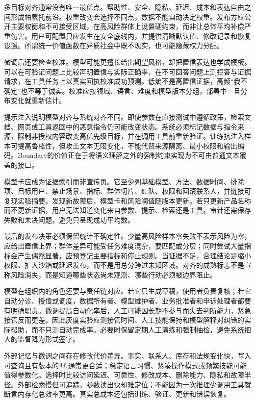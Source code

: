 多目标对齐通常没有唯一最优点。帮助性、安全、隐私、延迟、成本和表达自由之间形成帕累托前沿。权重改变会选择不同点，数据不能自动决定权重。发布方应公开主要权衡和不可接受区域，在高风险群体上设置硬约束，而非让总体平均补偿严重伤害。用户可配置只应发生在安全底线内，并提供清晰默认值、修改记录和恢复设置。所谓统一价值函数在异质社会中既不现实，也可能隐藏权力分配。

微调后还要检查校准。模型可能更擅长给出期望风格，却把置信表达也学成模板。可以在可验证问题上比较声明置信与实际正确率，在不可回答问题上测拒答与证据请求，在工具任务上以真实回执校准成功预测。低熵不是高置信证据，高频“我不确定”也不等于诚实。校准应按领域、语言、难度和模型版本分组，部署中一旦分布变化就重新估计。

提示注入说明模型对齐与系统对齐不同。即使参数在直接测试中遵循政策，检索文档、网页或工具返回中的恶意指令仍可能改变状态。系统必须标记数据与指令来源，限制非授权内容改变高优先级目标，并在调用工具前重新验证。训练抗注入样本可提高鲁棒性，但攻击文本无限变化，不能代替来源隔离、最小权限和输出编码。Boundary的价值正在于将语义理解之外的强制约束实现为不可由普通文本覆盖的接口。

模型卡应成为证据索引而非宣传页。它至少列基础模型、方法、数据时间、排除项、目标用户、禁止场景、指标、群体切片、红队、权限和回滚联系人，并链接可复现实验摘要。发现新故障后，模型卡和风险阈值随版本更新。若只更新产品名称而不更新证据，用户无法知道变化来自参数、提示、检索还是工具。审计还需保存失败和未决问题，避免只呈现成功平均数。

最后的发布决策必须保留统计不确定性。少量高风险样本零失败不表示风险为零，应给出置信上界；群体差异可能受任务难度混杂，要匹配或分层；同时尝试大量指标会产生偶然显著，应预登记主要指标和停止规则。当证据不足，合理结论是缩小权限、扩大沙箱或延迟发布，而不是用总分跨过未知区域。对齐的成熟标志不是宣称风险消失，而是知道哪些状态尚未观测、哪些行动必须被边界阻止。

模型在组织内的角色还要与责任链对应。若它只生成草稿，使用者负责复核；若它自动分诊、授信或调度，数据所有者、模型维护者、业务批准者和申诉处理者都要有明确职责。微调提高自动化率后，人工可能因长期不参与而失去判断能力，紧急接管反而更差。因此灰度实验应测接管时间、人工技能保持和模型解释对纠错的实际帮助，而不只测自动完成率。必要时保留定期人工演练和强制抽检，避免系统把人的监督降为形式签字。

外部记忆与微调之间存在修改代价差异。事实、联系人、库存和法规变化快，写入可查询且有版本的$M_e$通常更合适；稳定语言习惯、紧凑操作模式或频繁技能可能值得参数化。选择时比较访问延迟、可靠性、修改成本、删除能力、隐私和故障半径。外部检索慢但可追踪，参数读出快却难定位；不能因为一次推理少调用工具就断言内存化总效率更高。真实总成本还包括训练、验证、更新和错误恢复。

